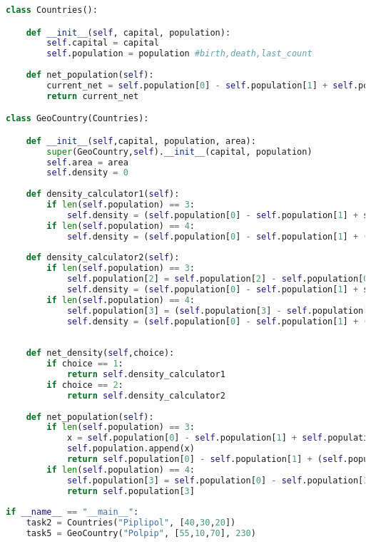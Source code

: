 \documentclass[letterpaper,12pt, scrartcl]{article}
\begin{document}
\begin{lstlisting}[language=Python, caption=My Code]
class Countries():

    def __init__(self, capital, population):
        self.capital = capital
        self.population = population #birth,death,last_count
        
    def net_population(self):
        current_net = self.population[0] - self.population[1] + self.population[2]
        return current_net

class GeoCountry(Countries):

    def __init__(self,capital, population, area):
        super(GeoCountry,self).__init__(capital, population)
        self.area = area
        self.density = 0
        
    def density_calculator1(self):
        if len(self.population) == 3:
            self.density = (self.population[0] - self.population[1] + self.population[2]) / self.area
        if len(self.population) == 4:
            self.density = (self.population[0] - self.population[1] + (self.population[2] + self.population[3]) / 2) / self.area
        
    def density_calculator2(self):
        if len(self.population) == 3:
            self.population[2] = self.population[2] - self.population[0] + self.population[1]
            self.density = (self.population[0] - self.population[1] + self.population[2]) / self.area
        if len(self.population) == 4:
            self.population[3] = (self.population[3] - self.population[0] + self.population[1]) * 2 - self.population[2]
            self.density = (self.population[0] - self.population[1] + (self.population[2] + self.population[3]) / 2) / self.area
        
        
    def net_density(self,choice):
        if choice == 1:
            return self.density_calculator1
        if choice == 2:
            return self.density_calculator2
    
    def net_population(self):
        if len(self.population) == 3:
            x = self.population[0] - self.population[1] + self.population[2]
            self.population.append(x)
            return self.population[0] - self.population[1] + (self.population[2] + self.population[3]) / 2
        if len(self.population) == 4:
            self.population[3] = self.population[0] - self.population[1] + (self.population[2] + self.population[3]) / 2
            return self.population[3]
            
if __name__ == "__main__":
    task2 = Countries("Piplipol", [40,30,20])
    task5 = GeoCountry("Polpip", [55,10,70], 230)


\end{lstlisting}
\end{document}
